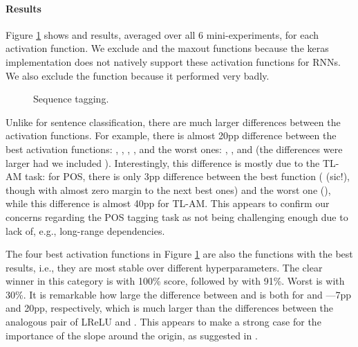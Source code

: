 \paragraph{Results}
Figure \ref{fig:seq} shows \best{} and \avg{} results, averaged over all 6 mini-experiments, for each activation function. We exclude \prelu{} and the maxout functions because the keras implementation does not natively support these activation functions for RNNs. We also exclude the \cube{} function because it performed very badly.  \begin{figure}[!htb]
\centering
\scalebox{0.5}{
}
\caption{Sequence tagging.}
\label{fig:seq}
\end{figure}

Unlike for sentence classification, there are much larger differences between the activation functions. For example, there is almost 20pp difference between the best \best{} activation functions: \relu{}, \lrelua{}, \swish{}, \pentan{}, and the worst ones: \linear{}, \cosid{}, and \sigmoid{} (the differences were larger had we included \cube{}). Interestingly, this difference is mostly due to the TL-AM task: for POS, there is only 3pp difference between the best function (\sigmoid{} (sic!), though with almost zero margin to the next best ones) and the worst one (\linear), while this difference is almost 40pp for TL-AM. 
This appears to confirm our concerns regarding the POS tagging task as not being challenging enough due to lack of, e.g., long-range dependencies.

The four best \best{} activation functions in Figure \ref{fig:seq} are also the functions with the best \avg{} results, i.e., they are most stable over different hyperparameters. %
The clear winner in this category is \pentan{} with 100\% \avg{} score, followed by \swish{} with 91\%. Worst is \cosid{} with 30\%. It is remarkable how large the difference between \mytanh{} and \pentan{} is both for \best{} and \avg{}---7pp and 20pp, respectively, which is much larger than the differences between the analogous pair of LReLU and \relu{}. This appears to make a strong case for the importance of the slope around the origin, as suggested in \citet{Xu:2016}. 

